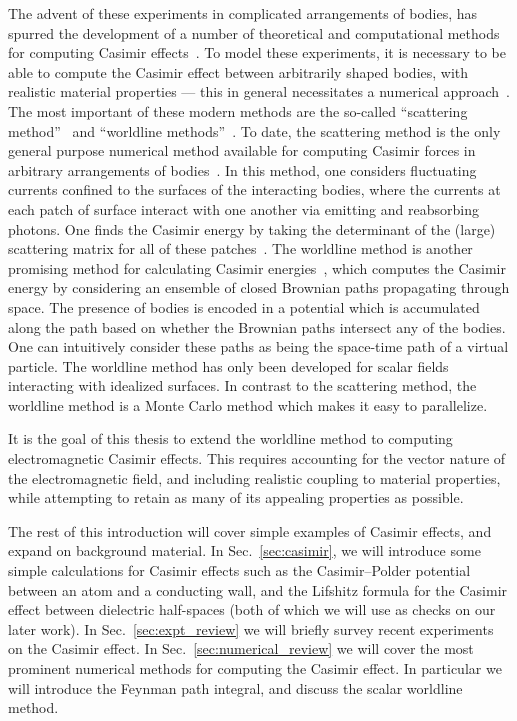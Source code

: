 The advent of these experiments in complicated arrangements of bodies, has spurred the development
of a number of theoretical and computational methods for computing Casimir effects~\cite{Dalvit2011,Bordag2009}. 
To model these experiments, it is necessary to be able to compute the Casimir effect between arbitrarily shaped bodies, with 
realistic material properties --- this in general necessitates a numerical approach~\cite{Johnson2011}.
The most important of these modern methods are the so-called ``scattering method''~\cite{Lambrecht2006,Rahi2009,Reid2009}
 and ``worldline methods''~\cite{Gies2003}.  To date, the scattering method is the only general purpose numerical method available for computing
Casimir forces in arbitrary arrangements of bodies~\cite{Reid2009,Reid2011,Reid2013}.  
In this method, one considers fluctuating currents confined to the surfaces of the interacting bodies,
where the currents at each patch of surface interact with one another via emitting and reabsorbing photons.
 One finds the Casimir energy by taking the determinant of the (large) scattering matrix for all of these patches~\cite{Reid2011}.  
The worldline method is another promising method for calculating Casimir energies~\cite{Gies2003},
which computes the Casimir energy by considering an ensemble of closed 
Brownian paths propagating through space.  The presence of bodies is encoded in a potential which is
accumulated along the path based on whether the Brownian paths intersect any of the bodies.
One can intuitively consider these paths as being the space-time path of a virtual particle.  
The worldline method has only been developed for scalar fields interacting with idealized surfaces.
In contrast to the scattering method, the worldline method is a Monte Carlo method which makes it 
easy to parallelize.  

It is the goal of this thesis to extend the worldline method to computing electromagnetic Casimir effects.
This requires accounting for the vector nature of the electromagnetic field, and including realistic coupling to 
material properties, while attempting to retain as many of its appealing properties as possible.    

The rest of this introduction will cover simple examples of Casimir effects, and expand on background material.
In Sec.~\ref{sec:casimir}, we will introduce some simple calculations for Casimir effects such as
the Casimir--Polder potential between an atom and a conducting wall, and the Lifshitz formula for the Casimir
effect between dielectric half-spaces (both of which we will use as checks on our later work).
In Sec.~\ref{sec:expt_review} we will briefly survey recent experiments on the Casimir effect.
In Sec.~\ref{sec:numerical_review} we will cover the most prominent numerical methods for computing the Casimir effect.
In particular we will introduce the Feynman path integral, and discuss the scalar worldline method.  

